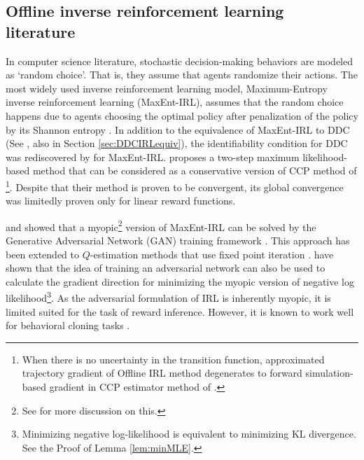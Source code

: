 \subsection{Offline inverse reinforcement learning literature} \; In computer science literature, stochastic decision-making behaviors are modeled as `random choice'. That is, they assume that agents randomize their actions. The most widely used inverse reinforcement learning model, Maximum-Entropy inverse reinforcement learning (MaxEnt-IRL), assumes that the random choice happens due to agents choosing the optimal policy after penalization of the policy by its Shannon entropy \citep{ermon2015learning}. In addition to the equivalence of MaxEnt-IRL to DDC (See \cite{ermon2015learning}, also in Section \ref{sec:DDCIRLequiv}), the identifiability condition for DDC \citep{magnac2002identifying} was rediscovered by \cite{cao2021identifiability} for MaxEnt-IRL. \cite{zeng2023understanding} proposes a two-step maximum likelihood-based method that can be considered as a conservative version of CCP method of \cite{hotz1993conditional}\footnote{When there is no uncertainty in the transition function, approximated trajectory gradient of Offline IRL method degenerates to forward simulation-based gradient in CCP estimator method of \cite{hotz1993conditional}.}.  
Despite that their method is proven to be convergent, its global convergence was limitedly proven only for linear reward functions.

\cite{finn2016connection} and \cite{fu2017learning} showed that a myopic\footnote{See \cite{cao2021identifiability} for more discussion on this.} version of MaxEnt-IRL can be solved by the Generative Adversarial Network (GAN) training framework \citep{goodfellow2020generative}. This approach has been extended to $Q$-estimation methods that use fixed point iteration \citep{geng2020deep, geng2023data}. \cite{ni2021f} have shown that the idea of training an adversarial network can also be used to calculate the gradient direction for minimizing the myopic version of negative log likelihood\footnote{Minimizing negative log-likelihood is equivalent to minimizing KL divergence. See the Proof of Lemma \ref{lem:minMLE}.}. As the adversarial formulation of IRL is inherently myopic, it is limited suited for the task of reward inference. However, it is known to work well for behavioral cloning tasks \citep{torabi2018behavioral}. 

